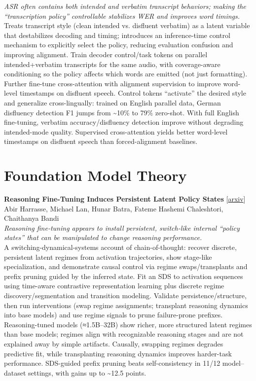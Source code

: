 \documentclass[12pt,letterpaper]{article}
\begin{document}
{\small\textit{ASR often contains both intended and verbatim transcript behaviors; making the ``transcription policy'' controllable stabilizes WER and improves word timings.}}\\[1pt]
{\footnotesize Treats transcript style (clean intended vs. disfluent verbatim) as a latent variable that destabilizes decoding and timing; introduces an inference-time control mechanism to explicitly select the policy, reducing evaluation confusion and improving alignment. Train decoder control/task tokens on parallel intended+verbatim transcripts for the same audio, with coverage-aware conditioning so the policy affects which words are emitted (not just formatting). Further fine-tune cross-attention with alignment supervision to improve word-level timestamps on disfluent speech. Control tokens ``activate'' the desired style and generalize cross-lingually: trained on English parallel data, German disfluency detection F1 jumps from \textasciitilde{}10\% to 79\% zero-shot. With full English fine-tuning, verbatim accuracy/disfluency detection improve without degrading intended-mode quality. Supervised cross-attention yields better word-level timestamps on disfluent speech than forced-alignment baselines.}

\medskip


\section*{Foundation Model Theory}

{\small\textbf{Reasoning Fine-Tuning Induces Persistent Latent Policy States}} {\scriptsize[\href{https://arxiv.org/abs/2607.18532}{arxiv}]}\\
{\scriptsize Abir Harrasse, Michael Lan, Hunar Batra, Fateme Hashemi Chaleshtori, Chaithanya Bandi}\\

{\small\textit{Reasoning fine-tuning appears to install persistent, switch-like internal ``policy states'' that can be manipulated to change reasoning performance.}}\\[1pt]
{\footnotesize A switching-dynamical-systems account of chain-of-thought: recover discrete, persistent latent regimes from activation trajectories, show stage-like specialization, and demonstrate causal control via regime swaps/transplants and prefix pruning guided by the inferred state. Fit an SDS to activation sequences using time-aware contrastive representation learning plus discrete regime discovery/segmentation and transition modeling. Validate persistence/structure, then run interventions (swap regime assignments; transplant reasoning dynamics into base models) and use regime signals to prune failure-prone prefixes. Reasoning-tuned models (≈1.5B--32B) show richer, more structured latent regimes than base models; regimes align with recognizable reasoning stages and are not explained away by simple artifacts. Causally, swapping regimes degrades predictive fit, while transplanting reasoning dynamics improves harder-task performance. SDS-guided prefix pruning beats self-consistency in 11/12 model--dataset settings, with gains up to \textasciitilde{}12.5 points.}
\end{document}
